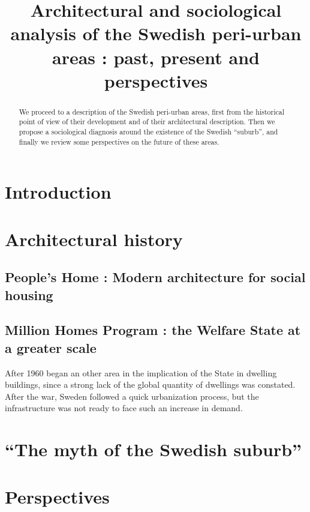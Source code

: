 \documentclass[english]{article}
\begin{document}
\title{Architectural and sociological analysis of the Swedish peri-urban
areas : past, present and perspectives}
\maketitle
\begin{abstract}
We proceed to a description of the Swedish peri-urban areas, first
from the historical point of view of their development and of their
architectural description. Then we propose a sociological diagnosis
around the existence of the Swedish ``suburb'', and finally we review
some perspectives on the future of these areas.
\end{abstract}

\section*{Introduction}


\section{Architectural history}


\subsection{People's Home : Modern architecture for social housing}


\subsection{Million Homes Program : the Welfare State at a greater scale}

After 1960 began an other area in the implication of the State in
dwelling buildings, since a strong lack of the global quantity of
dwellings was constated. After the war, Sweden followed a quick urbanization
process, but the infrastructure was not ready to face such an increase
in demand.


\section{``The myth of the Swedish suburb''}


\section{Perspectives}



\end{document}
